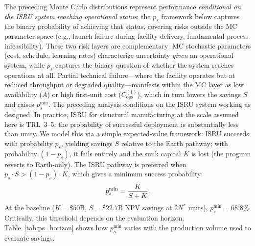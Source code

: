 \documentclass[5p,twocolumn]{elsarticle}
\begin{document}
The preceding Monte Carlo distributions represent performance \emph{conditional on the ISRU system reaching operational status}; the $p_s$ framework below captures the binary probability of achieving that status, covering risks outside the MC parameter space (e.g., launch failure during facility delivery, fundamental process infeasibility). These two risk layers are complementary: MC stochastic parameters (cost, schedule, learning rates) characterize uncertainty \emph{given} an operational system, while $p_s$ captures the binary question of whether the system reaches operations at all. Partial technical failure---where the facility operates but at reduced throughput or degraded quality---manifests within the MC layer as low availability ($A$) or high first-unit cost ($C_{\mathrm{ops}}^{(1)}$), which in turn lowers the savings $S$ and raises $p_s^{\min}$. The preceding analysis conditions on the ISRU system working as designed. In practice, ISRU for structural manufacturing at the scale assumed here is TRL~3--5; the probability of successful deployment is substantially less than unity. We model this via a simple expected-value framework: ISRU succeeds with probability $p_s$, yielding savings $S$ relative to the Earth pathway; with probability $(1 - p_s)$, it fails entirely and the sunk capital $K$ is lost (the program reverts to Earth-only). The ISRU pathway is preferred when $p_s \cdot S > (1 - p_s) \cdot K$, which gives a minimum success probability:
\begin{equation}\small
  p_s^{\min} = \frac{K}{S + K}.
  \label{eq:p_success}
\end{equation}
At the baseline ($K = \$50$B, $S = \$22.7$B NPV savings at $2N^*$ units), $p_s^{\min} = 68.8\%$. Critically, this threshold depends on the evaluation horizon. Table~\ref{tab:ps_horizon} shows how $p_s^{\min}$ varies with the production volume used to evaluate savings.

\begin{table}[htbp]
\centering
\caption{Minimum technical success probability $p_s^{\min}$ as a function of evaluation horizon ($r = 5\%$, $K = \$50$B).}
\label{tab:ps_horizon}
\small
{}
\end{table}
\end{document}
